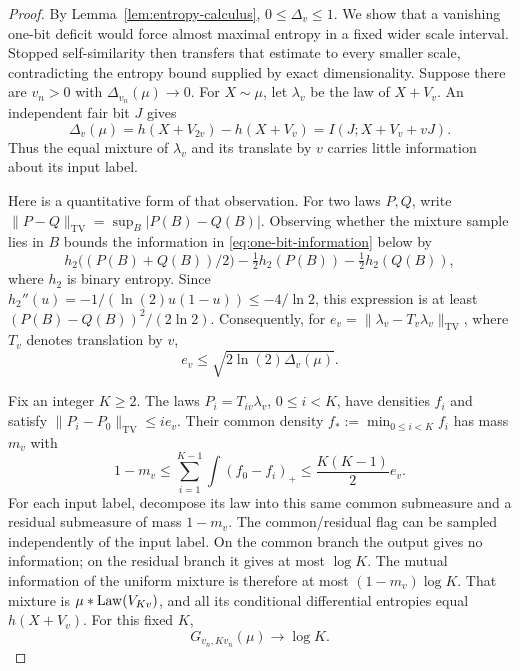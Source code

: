 \begin{proof}
By Lemma~\ref{lem:entropy-calculus}, $0\le\Delta_v\le1$.
We show that a vanishing one-bit deficit would force almost maximal
entropy in a fixed wider scale interval.  Stopped self-similarity then
transfers that estimate to every smaller scale, contradicting the
entropy bound supplied by exact dimensionality.
Suppose there are $v_n>0$ with $\Delta_{v_n}(\mu)\to0$.
For $X\sim\mu$, let $\lambda_v$ be the law of $X+V_v$.
An independent fair bit $J$ gives
\begin{equation}\label{eq:one-bit-information}
 \Delta_v(\mu)
 =h(X+V_{2v})-h(X+V_v)
 =I(J;X+V_v+vJ).
\end{equation}
Thus the equal mixture of $\lambda_v$ and its translate by $v$ carries
little information about its input label.

Here is a quantitative form of that observation.  For two laws $P,Q$,
write $\|P-Q\|_{\mathrm{TV}}=\sup_B|P(B)-Q(B)|$.
Observing whether the mixture sample lies in $B$ bounds the information
in \eqref{eq:one-bit-information} below by
\[
 h_2\bigl((P(B)+Q(B))/2\bigr)
 -\tfrac12h_2(P(B))-\tfrac12h_2(Q(B)),
\]
where $h_2$ is binary entropy.  Since
$h_2''(u)=-1/(\ln(2)u(1-u))\le-4/\ln2$, this expression is at least
$(P(B)-Q(B))^2/(2\ln2)$.  Consequently, for
$e_v=\|\lambda_v-T_v\lambda_v\|_{\mathrm{TV}}$, where $T_v$ denotes
translation by $v$,
\begin{equation}\label{eq:small-information-tv}
 e_v\le\sqrt{2\ln(2)\Delta_v(\mu)}.
\end{equation}

Fix an integer $K\ge2$.  The laws
$P_i=T_{iv}\lambda_v$, $0\le i<K$, have densities $f_i$ and satisfy
$\|P_i-P_0\|_{\mathrm{TV}}\le i e_v$.
Their common density $f_*:=\min_{0\le i<K}f_i$ has mass $m_v$ with
\begin{equation}\label{eq:common-density-mass}
 1-m_v\le\sum_{i=1}^{K-1}\int(f_0-f_i)_+
 \le\frac{K(K-1)}2 e_v.
\end{equation}
For each input label, decompose its law into this same common
submeasure and a residual submeasure of mass $1-m_v$.
The common/residual flag can be sampled independently of the input
label.  On the common branch the output gives no information; on the
residual branch it gives at most $\log K$.  The mutual information of
the uniform mixture is therefore at most $(1-m_v)\log K$.
That mixture is $\mu*\operatorname{Law}(V_{Kv})$, and all its conditional
differential entropies equal $h(X+V_v)$.  For this fixed $K$,
\begin{equation}\label{eq:large-window-saturation}
 G_{v_n,Kv_n}(\mu)\longrightarrow\log K.
\end{equation}


\end{proof}
